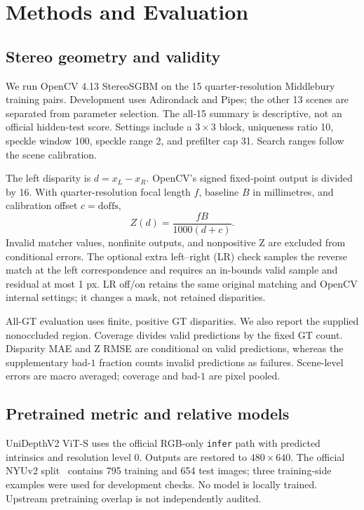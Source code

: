 \documentclass[10pt,twocolumn,letterpaper]{article}
\begin{document}
\section{Methods and Evaluation}
\subsection{Stereo geometry and validity}
We run OpenCV 4.13 StereoSGBM on the 15 quarter-resolution Middlebury training pairs. Development uses Adirondack and Pipes; the other 13 scenes are separated from parameter selection. The all-15 summary is descriptive, not an official hidden-test score. Settings include a $3\times3$ block, uniqueness ratio 10, speckle window 100, speckle range 2, and prefilter cap 31. Search ranges follow the scene calibration.

The left disparity is $d=x_L-x_R$. OpenCV's signed fixed-point output is divided by 16. With quarter-resolution focal length $f$, baseline $B$ in millimetres, and calibration offset $c=\mathrm{doffs}$,
\begin{equation}
Z(d)=\frac{fB}{1000(d+c)}.
\label{eq:depth}
\end{equation}
Invalid matcher values, nonfinite outputs, and nonpositive Z are excluded from conditional errors. The optional extra left--right (LR) check samples the reverse match at the left correspondence and requires an in-bounds valid sample and residual at most 1 px. LR off/on retains the same original matching and OpenCV internal settings; it changes a mask, not retained disparities.

All-GT evaluation uses finite, positive GT disparities. We also report the supplied nonoccluded region. Coverage divides valid predictions by the fixed GT count. Disparity MAE and Z RMSE are conditional on valid predictions, whereas the supplementary bad-$1$ fraction counts invalid predictions as failures. Scene-level errors are macro averaged; coverage and bad-$1$ are pixel pooled.

\subsection{Pretrained metric and relative models}
UniDepthV2 ViT-S uses the official RGB-only \texttt{infer} path with predicted intrinsics and resolution level 0. Outputs are restored to $480\times640$. The official NYUv2 split~\cite{nyu} contains 795 training and 654 test images; three training-side examples were used for development checks. No model is locally trained. Upstream pretraining overlap is not independently audited.
\end{document}
